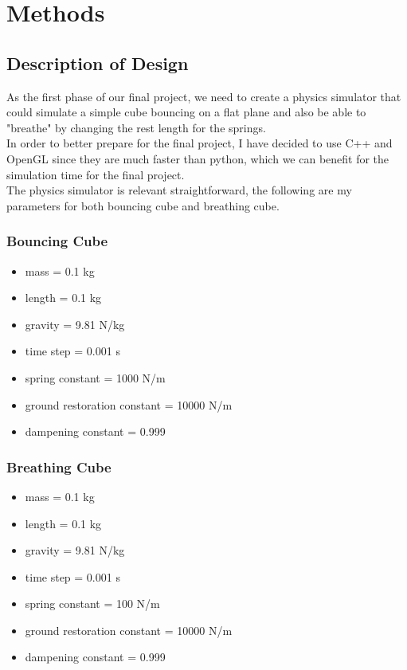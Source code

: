\documentclass[12pt]{article}
\begin{document}
\newpage
\section{Methods}
\subsection{Description of Design}
As the first phase of our final project, we need to create a physics simulator that could simulate a simple cube bouncing on a flat plane and also be able to "breathe" by changing the rest length for the springs.\\
In order to better prepare for the final project, I have decided to use C++ and OpenGL since they are much faster than python, which we can benefit for the simulation time for the final project.\\
The physics simulator is relevant straightforward, the following are my parameters for both bouncing cube and breathing cube.
\subsubsection{Bouncing Cube}
\begin{itemize}
\setlength\itemsep{0em}
\item mass = 0.1 kg
\item length = 0.1 kg
\item gravity = 9.81 N/kg
\item time step = 0.001 s
\item spring constant = 1000 N/m
\item ground restoration constant = 10000 N/m
\item dampening constant = 0.999
\end{itemize}

\subsubsection{Breathing Cube}
\begin{itemize}
\setlength\itemsep{0em}
\item mass = 0.1 kg
\item length = 0.1 kg
\item gravity = 9.81 N/kg
\item time step = 0.001 s
\item spring constant = 100 N/m
\item ground restoration constant = 10000 N/m
\item dampening constant = 0.999
\end{itemize}
\end{document}
